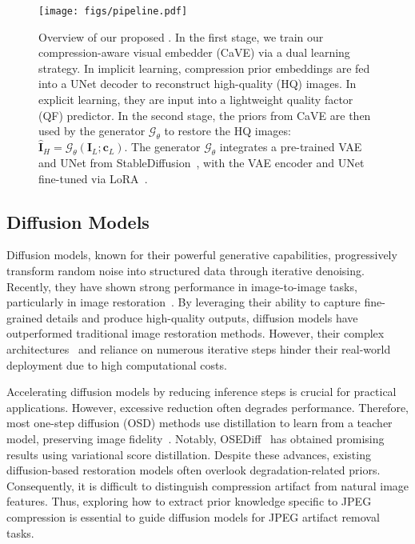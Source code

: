 \begin{figure*}[t]
    \begin{center}
        \texttt{[image: figs/pipeline.pdf]}
    \end{center}
    \vspace{-20pt}
    \caption{Overview of our proposed \mymodel. In the first stage, we train our compression-aware visual embedder (CaVE) via a dual learning strategy. In implicit learning, compression prior embeddings are fed into a UNet decoder to reconstruct high-quality (HQ) images. In explicit learning, they are input into a lightweight quality factor (QF) predictor. In the second stage, the priors from CaVE are then used by the generator $\mathcal{G}_\theta$ to restore the HQ images: $\hat{\mathbf{I}}_H=\mathcal{G}_\theta(\mathbf{I}_L;\mathbf{c}_L)$. The generator $\mathcal{G}_\theta$ integrates a pre-trained VAE and UNet from StableDiffusion~\cite{rombach2022high}, with the VAE encoder and UNet fine-tuned via LoRA~\cite{hu2021lora}.} 
    \label{fig:pipeline}
    \vspace{-15pt}
\end{figure*}



\subsection{Diffusion Models}
\vspace{-2mm}
Diffusion models, known for their powerful generative capabilities, progressively transform random noise into structured data through iterative denoising. Recently, they have shown strong performance in image-to-image tasks, particularly in image restoration~\cite{wang2024exploiting,lin2024diffbir,wu2024seesr,yang2024pixel,yue2024resshift,jiang2024autodir,yu2024scaling}. By leveraging their ability to capture fine-grained details and produce high-quality outputs, diffusion models have outperformed traditional image restoration methods. However, their complex architectures~\cite{lin2024diffbir,yu2024scaling,yang2024pixel} and reliance on numerous iterative steps hinder their real-world deployment due to high computational costs.

Accelerating diffusion models by reducing inference steps is crucial for practical applications. However, excessive reduction often degrades performance. Therefore, most one-step diffusion (OSD) methods use distillation to learn from a teacher model, preserving image fidelity~\cite{yin2024dmd,yin2024dmd2,wang2024sinsr}. Notably, OSEDiff~\cite{wu2024one} has obtained promising results using variational score distillation. Despite these advances, existing diffusion-based restoration models often overlook degradation-related priors. Consequently, it is difficult to distinguish compression artifact from natural image features. Thus, exploring how to extract prior knowledge specific to JPEG compression is essential to guide diffusion models for JPEG artifact removal tasks.

